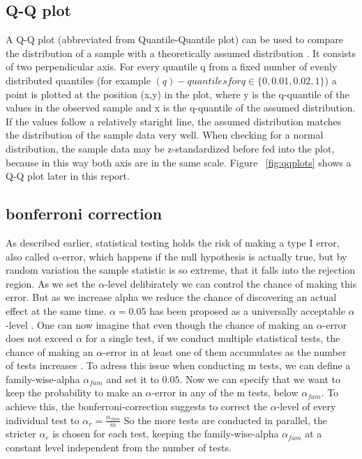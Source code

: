 \documentclass[12 pt]{scrartcl}
\begin{document}
\subsection{Q-Q plot}

A Q-Q plot (abbreviated from Quantile-Quantile plot) can be used to compare the distribution of a sample with a theoretically assumed distribution \citep[p.~97]{eckstein2006angewandte}. It consists of two perpendicular axis. For every quantile q from a fixed number of evenly distributed quantiles (for example $(q)-quantiles for q \in \{0,0.01,0.02,1\} $) a point is plotted at the position (x,y) in the plot, where y is the q-quantile of the values in the observed sample and x is the q-quantile of the assumed distribution. If the values follow a relatively staright line, the assumed distribution matches the distribution of the sample data very well.
When checking for a normal distribution, the sample data may be z-standardized before fed into the plot, because in this way both axis are in the same scale.
Figure ~\ref{fig:qqplots} shows a Q-Q plot later in this report.

\subsection{bonferroni correction}

As described earlier, statistical testing holds the risk of making a type I error, also called $\alpha$-error, which happens if the null hypothesis is actually true, but by random variation the sample statistic is so extreme, that it falls into the rejection region. As we set the $\alpha$-level delibirately we can control the chance of making this error. But as we increase alpha we reduce the chance of discovering an actual effect at the same time. $\alpha = 0.05$ has been proposed as a universally acceptable $\alpha$-level \citep[p.~219]{eid2017statistik}. One can now imagine that even though the chance of making an $\alpha$-error does not exceed $\alpha$ for a single test, if we conduct multiple statistical tests, the chance of making an $\alpha$-error in at least one of them accumulates as the number of tests increases \citep[p.~416]{eid2017statistik}.
To adress this issue when conducting m tests, we can define a family-wise-alpha $\alpha_{fam}$ and set it to $0.05$. Now we can specify that we want to keep the probability to make an $\alpha$-error in any of the m tests, below $\alpha_{fam}$. To achieve this, the bonferroni-correction suggests to correct the $\alpha$-level of every individual test to $\alpha_{r} = \frac{\alpha_{fam}}{m}$ \citep[p.~417]{eid2017statistik}
So the more tests are conducted in parallel, the stricter $\alpha_{r}$ is chosen for each test, keeping the family-wise-alpha $\alpha_{fam}$ at a constant level independent from the number of tests.
\end{document}
